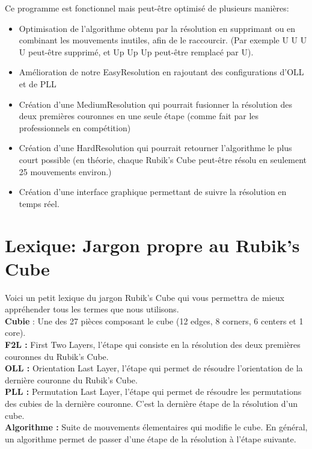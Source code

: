 \documentclass[a4paper,12pt]{article}
\begin{document}
Ce programme est fonctionnel mais peut-être optimisé de plusieurs manières:\\

\begin{itemize}
 \item Optimisation de l'algorithme obtenu par la résolution en supprimant ou en combinant les mouvements inutiles, afin de le raccourcir. (Par exemple U U U U peut-être supprimé, et Up Up Up peut-être remplacé par U).
 \item Amélioration de notre EasyResolution en rajoutant des configurations d'OLL et de PLL
 \item Création d'une MediumResolution qui pourrait fusionner la résolution des deux premières couronnes en une seule étape (comme fait par les professionnels en compétition)
 \item Création d'une HardResolution qui pourrait retourner l'algorithme le plus court possible (en théorie, chaque Rubik's Cube peut-être résolu en seulement 25 mouvements environ.)
 \item Création d'une interface graphique permettant de suivre la résolution en temps réel.
\end{itemize}

\section{Lexique: Jargon propre au Rubik's Cube}

Voici un petit lexique du jargon Rubik’s Cube qui vous permettra de
mieux appréhender tous les termes que nous utilisons.\\

\textbf{Cubie }: Une des 27 pièces composant le cube (12 edges, 8 corners, 6
centers et 1 core).\\

\textbf{F2L :} First Two Layers, l’étape qui consiste en la résolution des deux
premières couronnes du Rubik’s Cube.\\

\textbf{OLL :} Orientation Last Layer, l’étape qui permet de résoudre l’orientation de la dernière couronne du Rubik’s Cube.\\

\textbf{PLL :} Permutation Last Layer, l’étape qui permet de résoudre les permutations des cubies de la dernière couronne. C’est la dernière étape de la résolution d’un cube.\\

\textbf{Algorithme :} Suite de mouvements élementaires qui modifie le cube. En général, un algorithme permet de passer d'une étape de la résolution à l'étape suivante.\\
\end{document}
